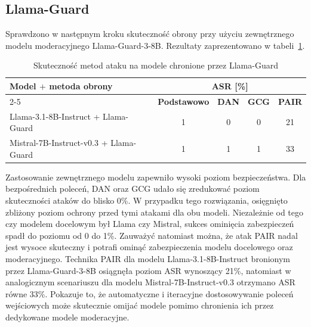 \subsection{Llama-Guard}
Sprawdzono w następnym kroku skuteczność obrony przy użyciu zewnętrznego modelu moderacyjnego Llama-Guard-3-8B. Rezultaty zaprezentowano w tabeli~\ref{tab:guard_comparison_tab}.
\begin{table}[!ht]
    \centering
    \renewcommand{\arraystretch}{1.2}
    \begin{tabular}{l|c|c|c|c}
        \hline
        \multirow{2}{*}{\textbf{Model $+$ metoda obrony}} & \multicolumn{4}{c}{\textbf{ASR [\%]}}                                               \\\cline{2-5}
                                                          & \textbf{Podstawowo}                   & \textbf{DAN} & \textbf{GCG} & \textbf{PAIR} \\\hline
        Llama-3.1-8B-Instruct + Llama-Guard               & 1                                     & 0            & 0            & 21            \\\hline
        Mistral-7B-Instruct-v0.3 + Llama-Guard            & 1                                     & 1            & 1            & 33            \\\hline
    \end{tabular}
    \caption{\label{tab:guard_comparison_tab}Skuteczność metod ataku na modele chronione przez Llama-Guard}
\end{table}
Zastosowanie zewnętrznego modelu zapewniło wysoki poziom bezpieczeństwa. Dla bezpośrednich poleceń, \gls{DAN} oraz \gls{GCG} udało się zredukować poziom skuteczności ataków do blisko 0\%. W przypadku tego rozwiązania, osięgnięto zbliżony poziom ochrony przed tymi atakami dla obu modeli. Niezależnie od tego czy modelem docelowym był Llama czy Mistral, sukces ominięcia zabezpieczeń spadł do poziomu od 0 do 1\%. Zauważyć natomiast można, że atak \gls{PAIR} nadal jest wysoce skuteczny i potrafi ominąć zabezpieczenia modelu docelowego oraz moderacyjnego. Technika \gls{PAIR} dla modelu Llama-3.1-8B-Instruct bronionym przez Llama-Guard-3-8B osiągnęła poziom \gls{ASR} wynoszący 21\%, natomiast w analogicznym scenariuszu dla modelu Mistral-7B-Instruct-v0.3 otrzymano \gls{ASR} równe 33\%. Pokazuje to, że automatyczne i iteracyjne dostosowywanie poleceń wejściowych może skutecznie omijać modele pomimo chronienia ich przez dedykowane modele moderacyjne.

